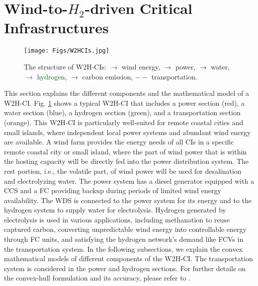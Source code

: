 \documentclass[conference]{IEEEtran}
\begin{document}
\section{Wind-to-$H_{2}$-driven Critical Infrastructures}  \label{sec: W2HCI}
\begin{figure}[t]
  \centering
{\texttt{[image: Figs/W2HCIs.jpg]}}
 \centering
           \vspace{-.3cm}
  \caption{\footnotesize The structure of W2H-CIs:  \textcolor{lgreen}{\textbf{$\rightarrow$} wind energy}, \textcolor{pred}{\textbf{$\rightarrow$} power}, \textcolor{wblue}{\textbf{$\rightarrow$} water}, \textcolor{darkgreen}{\textbf{$\rightarrow$} hydrogen}, \textcolor{cpurple}{\textbf{$\rightarrow$} carbon emission}, \textcolor{torange}{\textbf{$--$} transportation}.}
          \vspace{-.5cm}
  \label{Fig: W2H-CI}
\end{figure}

This section explains the different components and the mathematical model of a W2H-CI. Fig. \ref{Fig: W2H-CI} shows a typical W2H-CI that includes a power section (red), a water section (blue), a hydrogen section (green), and a transportation section (orange). This W2H-CI is particularly well-suited for remote coastal cities and small islands, where independent local power systems and abundant wind energy are available. A wind farm provides the energy needs of all CIs in a specific remote coastal city or small island, where the part of wind power that is within the hosting capacity will be directly fed into the power distribution system. The rest portion, i.e., the volatile part, of wind power will be used for desalination and electrolyzing water. The power system has a diesel generator equipped with a CCS and a FC providing backup during periods of limited wind energy availability. The WDS is connected to the power system for its energy and to the hydrogen system to supply water for electrolysis. Hydrogen generated by electrolysis is used in various applications, including methanation to reuse captured carbon, converting unpredictable wind energy into controllable energy through FC units, and satisfying the hydrogen network's demand like FCVs in the transportation system. In the following subsections, we explain the convex mathematical models of different components of the W2H-CI. The transportation system is considered in the power and hydrogen sections. For further details on the convex-hull formulation and its accuracy, please refer to \cite{li2018micro,goodarzi2023hybrid}.
\end{document}
